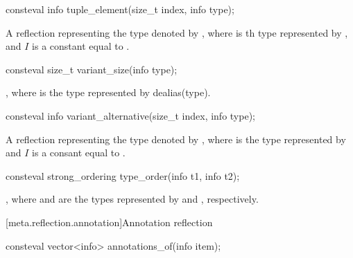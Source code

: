 %
\begin{itemdecl}
consteval info tuple_element(size_t index, info type);
\end{itemdecl}

\begin{itemdescr}
\pnum
\returns
A reflection representing
the type denoted by ,
where  is th type represented by ,
and $I$ is a constant equal to .
\end{itemdescr}

%
\begin{itemdecl}
consteval size_t variant_size(info type);
\end{itemdecl}

\begin{itemdescr}
\pnum
\returns
{},
where  is the type represented by dealias(type).
\end{itemdescr}

%
\begin{itemdecl}
consteval info variant_alternative(size_t index, info type);
\end{itemdecl}

\begin{itemdescr}
\pnum
\returns
A reflection representing the type denoted by
,
where  is the type represented by 
and $I$ is a consant equal to .
\end{itemdescr}

%
\begin{itemdecl}
consteval strong_ordering type_order(info t1, info t2);
\end{itemdecl}

\begin{itemdescr}
\pnum
\returns
{},
where  and  are the types
represented by  and , respectively.
\end{itemdescr}

[meta.reflection.annotation]{Annotation reflection}

%
\begin{itemdecl}
consteval vector<info> annotations_of(info item);
\end{itemdecl}

